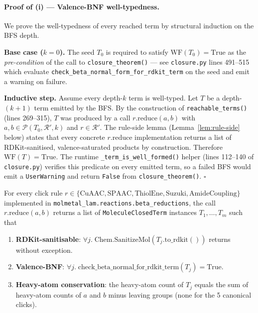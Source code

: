 \paragraph{Proof of (i) — Valence-BNF well-typedness.}

We prove the well-typedness of every reached term by structural
induction on the BFS depth.

\textbf{Base case ($k=0$).}  The seed $T_0$ is required to satisfy
$\mathrm{WF}(T_0) = \mathrm{True}$ as the \emph{pre-condition} of
the call to \texttt{closure\_theorem()} — see
\texttt{closure.py} lines 491--515 which evaluate
\texttt{check\_beta\_normal\_form\_for\_rdkit\_term} on the seed and
emit a warning on failure.

\textbf{Inductive step.}  Assume every depth-$k$ term is well-typed.
Let $T$ be a depth-$(k{+}1)$ term emitted by the BFS.  By the
construction of \texttt{reachable\_terms()} (lines 269--315),
$T$ was produced by a call $r.\mathrm{reduce}(a, b)$ with
$a, b \in \mathcal{P}(T_0, \mathcal{R}', k)$ and $r \in
\mathcal{R}'$.  The rule-side lemma (Lemma~\ref{lem:rule-side}
below) states that every concrete $r.\mathrm{reduce}$
implementation returns a list of RDKit-sanitised, valence-saturated
products by construction.  Therefore $\mathrm{WF}(T) = \mathrm{True}$.
The runtime \texttt{\_term\_is\_well\_formed()} helper (lines
112--140 of \texttt{closure.py}) verifies this predicate on every
emitted term, so a failed BFS would emit a
\texttt{UserWarning} and return \texttt{False} from
\texttt{closure\_theorem()}.  $\square$

\begin{lemma}
\label{lem:rule-side}
For every click rule $r \in \{\mathrm{CuAAC}, \mathrm{SPAAC},
\mathrm{ThiolEne}, \mathrm{Suzuki}, \mathrm{AmideCoupling}\}$
implemented in
\texttt{molmetal\_lam.reactions.beta\_reductions}, the call
$r.\mathrm{reduce}(a, b)$ returns a list of
\texttt{MoleculeClosedTerm} instances $T_1, \dots, T_m$ such that
\begin{enumerate}
  \item \textbf{RDKit-sanitisable}: $\forall j.\;
        \mathrm{Chem.SanitizeMol}(T_j.\mathrm{to\_rdkit()})$
        returns without exception.
  \item \textbf{Valence-BNF}: $\forall j.\;
        \mathrm{check\_beta\_normal\_for\_rdkit\_term}(T_j)
        = \mathrm{True}$.
  \item \textbf{Heavy-atom conservation}: the heavy-atom count of
        $T_j$ equals the sum of heavy-atom counts of $a$ and $b$
        minus leaving groups (none for the 5 canonical clicks).
\end{enumerate}
\end{lemma}

